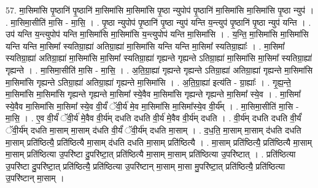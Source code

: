 \documentclass[17pt]{extarticle}
\begin{document}
57. मा॒सिमा॑सि पृ॒ष्ठानि॑ पृ॒ष्ठानि॑ मा॒सिमा॑सि मा॒सिमा॑सि पृ॒ष्ठा न्युपोप॑ पृ॒ष्ठानि॑ मा॒सिमा॑सि मा॒सिमा॑सि पृ॒ष्ठा न्युप॑ । . मा॒सिमा॒सीति॑ मा॒सि - मा॒सि॒ । . पृ॒ष्ठा न्युपोप॑ पृ॒ष्ठानि॑ पृ॒ष्ठा न्युप॑ यन्ति य॒न्त्युप॑ पृ॒ष्ठानि॑ पृ॒ष्ठा न्युप॑ यन्ति । . उप॑ यन्ति य॒न्त्युपोप॑ यन्ति मा॒सिमा॑सि मा॒सिमा॑सि य॒न्त्युपोप॑ यन्ति मा॒सिमा॑सि । . य॒न्ति॒ मा॒सिमा॑सि मा॒सिमा॑सि यन्ति यन्ति मा॒सिमा᳚ स्यतिग्रा॒ह्या॑ अतिग्रा॒ह्या॑ मा॒सिमा॑सि यन्ति यन्ति मा॒सिमा᳚
स्यतिग्रा॒ह्याः᳚ । . मा॒सिमा᳚ स्यतिग्रा॒ह्या॑ अतिग्रा॒ह्या॑ मा॒सिमा॑सि मा॒सिमा᳚ स्यतिग्रा॒ह्या॑ गृह्यन्ते गृह्यन्ते ऽतिग्रा॒ह्या॑ मा॒सिमा॑सि मा॒सिमा᳚ स्यतिग्रा॒ह्या॑ गृह्यन्ते । . मा॒सिमा॒सीति॑ मा॒सि - मा॒सि॒ । . अ॒ति॒ग्रा॒ह्या॑ गृह्यन्ते गृह्यन्ते ऽतिग्रा॒ह्या॑ अतिग्रा॒ह्या॑ गृह्यन्ते मा॒सिमा॑सि मा॒सिमा॑सि गृह्यन्ते ऽतिग्रा॒ह्या॑ अतिग्रा॒ह्या॑ गृह्यन्ते मा॒सिमा॑सि । . अ॒ति॒ग्रा॒ह्या॑ इत्य॑ति - ग्रा॒ह्याः᳚ । . गृ॒ह्य॒न्ते॒ मा॒सिमा॑सि मा॒सिमा॑सि गृह्यन्ते गृह्यन्ते मा॒सिमा᳚ स्ये॒वैव मा॒सिमा॑सि गृह्यन्ते गृह्यन्ते मा॒सिमा᳚ स्ये॒व । . मा॒सिमा᳚ स्ये॒वैव मा॒सिमा॑सि मा॒सिमा᳚ स्ये॒व वी॒र्यं॑ ॅवी॒र्य॑ मे॒व मा॒सिमा॑सि मा॒सिमा᳚स्ये॒व वी॒र्य᳚म् । . मा॒सिमा॒सीति॑ मा॒सि - मा॒सि॒ । . ए॒व वी॒र्यं॑ ॅवी॒र्य॑ मे॒वैव वी॒र्य॑म् दधति दधति वी॒र्य॑ मे॒वैव वी॒र्य॑म् दधति । . वी॒र्य॑म् दधति दधति वी॒र्यं॑ ॅवी॒र्य॑म् दधति मा॒साम् मा॒साम् द॑धति वी॒र्यं॑ ॅवी॒र्य॑म् दधति मा॒साम् । . द॒ध॒ति॒ मा॒साम् मा॒साम् द॑धति दधति मा॒साम् प्रति॑ष्ठित्यै॒ प्रति॑ष्ठित्यै मा॒साम् द॑धति दधति मा॒साम् प्रति॑ष्ठित्यै । . मा॒साम् प्रति॑ष्ठित्यै॒ प्रति॑ष्ठित्यै मा॒साम् मा॒साम् प्रति॑ष्ठित्या उ॒परि॑ष्टा दु॒परि॑ष्टा॒त् प्रति॑ष्ठित्यै मा॒साम् मा॒साम् प्रति॑ष्ठित्या उ॒परि॑ष्टात् । . प्रति॑ष्ठित्या उ॒परि॑ष्टा दु॒परि॑ष्टा॒त् प्रति॑ष्ठित्यै॒ प्रति॑ष्ठित्या उ॒परि॑ष्टान् मा॒साम् मा॒सा मु॒परि॑ष्टा॒त् प्रति॑ष्ठित्यै॒ प्रति॑ष्ठित्या उ॒परि॑ष्टान् मा॒साम् । \newline
\end{document}

